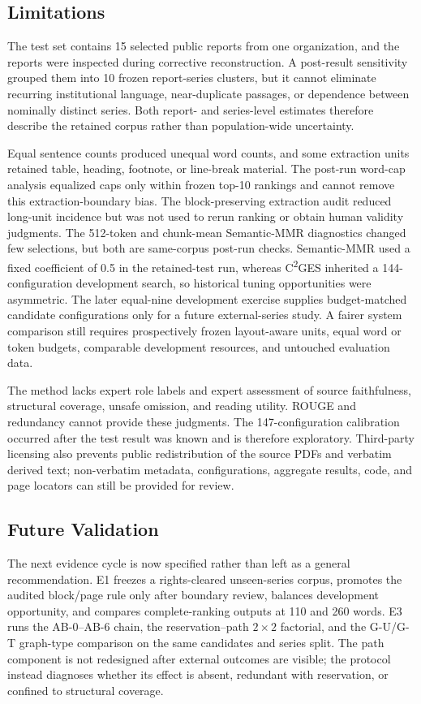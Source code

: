 \documentclass[applsci,article,submit,moreauthors]{Definitions/mdpi}
\newcommand{\cges}{C\textsuperscript{2}GES}
\begin{document}
\subsection{Limitations}

The test set contains 15 selected public reports from one organization, and the reports were inspected during corrective reconstruction. A post-result sensitivity grouped them into 10 frozen report-series clusters, but it cannot eliminate recurring institutional language, near-duplicate passages, or dependence between nominally distinct series. Both report- and series-level estimates therefore describe the retained corpus rather than population-wide uncertainty.

Equal sentence counts produced unequal word counts, and some extraction units retained table, heading, footnote, or line-break material. The post-run word-cap analysis equalized caps only within frozen top-10 rankings and cannot remove this extraction-boundary bias. The block-preserving extraction audit reduced long-unit incidence but was not used to rerun ranking or obtain human validity judgments. The 512-token and chunk-mean Semantic-MMR diagnostics changed few selections, but both are same-corpus post-run checks. Semantic-MMR used a fixed coefficient of 0.5 in the retained-test run, whereas \cges{} inherited a 144-configuration development search, so historical tuning opportunities were asymmetric. The later equal-nine development exercise supplies budget-matched candidate configurations only for a future external-series study. A fairer system comparison still requires prospectively frozen layout-aware units, equal word or token budgets, comparable development resources, and untouched evaluation data.

The method lacks expert role labels and expert assessment of source faithfulness, structural coverage, unsafe omission, and reading utility. ROUGE and redundancy cannot provide these judgments. The 147-configuration calibration occurred after the test result was known and is therefore exploratory. Third-party licensing also prevents public redistribution of the source PDFs and verbatim derived text; non-verbatim metadata, configurations, aggregate results, code, and page locators can still be provided for review.

\subsection{Future Validation}

The next evidence cycle is now specified rather than left as a general recommendation. E1 freezes a rights-cleared unseen-series corpus, promotes the audited block/page rule only after boundary review, balances development opportunity, and compares complete-ranking outputs at 110 and 260 words. E3 runs the AB-0--AB-6 chain, the reservation--path $2\times2$ factorial, and the G-U/G-T graph-type comparison on the same candidates and series split. The path component is not redesigned after external outcomes are visible; the protocol instead diagnoses whether its effect is absent, redundant with reservation, or confined to structural coverage.
\end{document}
